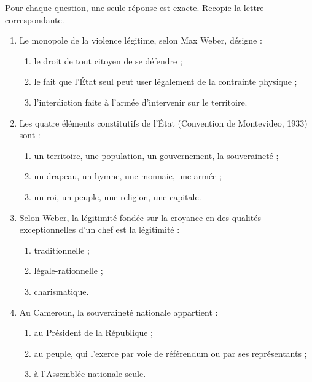 \documentclass[11pt]{article}
\begin{document}
\begin{exercice}
Pour chaque question, une seule réponse est exacte. Recopie la lettre correspondante.
\begin{enumerate}
\item Le monopole de la violence légitime, selon Max Weber, désigne :
\begin{enumerate}
\item[a)] le droit de tout citoyen de se défendre ;
\item[b)] le fait que l'État seul peut user légalement de la contrainte physique ;
\item[c)] l'interdiction faite à l'armée d'intervenir sur le territoire.
\end{enumerate}
\item Les quatre éléments constitutifs de l'État (Convention de Montevideo, 1933) sont :
\begin{enumerate}
\item[a)] un territoire, une population, un gouvernement, la souveraineté ;
\item[b)] un drapeau, un hymne, une monnaie, une armée ;
\item[c)] un roi, un peuple, une religion, une capitale.
\end{enumerate}
\item Selon Weber, la légitimité fondée sur la croyance en des qualités exceptionnelles d'un chef est la légitimité :
\begin{enumerate}
\item[a)] traditionnelle ; \item[b)] légale-rationnelle ; \item[c)] charismatique.
\end{enumerate}
\item Au Cameroun, la souveraineté nationale appartient :
\begin{enumerate}
\item[a)] au Président de la République ; \item[b)] au peuple, qui l'exerce par voie de référendum ou par ses représentants ; \item[c)] à l'Assemblée nationale seule.
\end{enumerate}
\end{enumerate}
\end{exercice}
\end{document}
